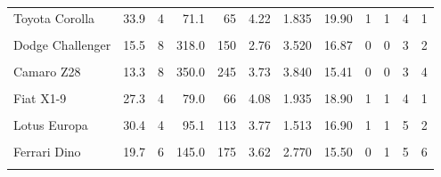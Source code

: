 \documentclass[
  10pt,
]{scrartcl}
\begin{document}
\begin{longtable}[t]{lrrrrrrrrrrr}
Toyota Corolla & 33.9 & 4 & 71.1 & 65 & 4.22 & 1.835 & 19.90 & 1 & 1 & 4 & 1\\
\addlinespace
\cellcolor{gray!10}{Toyota Corona} & \cellcolor{gray!10}{21.5} & \cellcolor{gray!10}{4} & \cellcolor{gray!10}{120.1} & \cellcolor{gray!10}{97} & \cellcolor{gray!10}{3.70} & \cellcolor{gray!10}{2.465} & \cellcolor{gray!10}{20.01} & \cellcolor{gray!10}{1} & \cellcolor{gray!10}{0} & \cellcolor{gray!10}{3} & \cellcolor{gray!10}{1}\\
Dodge Challenger & 15.5 & 8 & 318.0 & 150 & 2.76 & 3.520 & 16.87 & 0 & 0 & 3 & 2\\
\cellcolor{gray!10}{AMC Javelin} & \cellcolor{gray!10}{15.2} & \cellcolor{gray!10}{8} & \cellcolor{gray!10}{304.0} & \cellcolor{gray!10}{150} & \cellcolor{gray!10}{3.15} & \cellcolor{gray!10}{3.435} & \cellcolor{gray!10}{17.30} & \cellcolor{gray!10}{0} & \cellcolor{gray!10}{0} & \cellcolor{gray!10}{3} & \cellcolor{gray!10}{2}\\
Camaro Z28 & 13.3 & 8 & 350.0 & 245 & 3.73 & 3.840 & 15.41 & 0 & 0 & 3 & 4\\
\cellcolor{gray!10}{Pontiac Firebird} & \cellcolor{gray!10}{19.2} & \cellcolor{gray!10}{8} & \cellcolor{gray!10}{400.0} & \cellcolor{gray!10}{175} & \cellcolor{gray!10}{3.08} & \cellcolor{gray!10}{3.845} & \cellcolor{gray!10}{17.05} & \cellcolor{gray!10}{0} & \cellcolor{gray!10}{0} & \cellcolor{gray!10}{3} & \cellcolor{gray!10}{2}\\
\addlinespace
Fiat X1-9 & 27.3 & 4 & 79.0 & 66 & 4.08 & 1.935 & 18.90 & 1 & 1 & 4 & 1\\
\cellcolor{gray!10}{Porsche 914-2} & \cellcolor{gray!10}{26.0} & \cellcolor{gray!10}{4} & \cellcolor{gray!10}{120.3} & \cellcolor{gray!10}{91} & \cellcolor{gray!10}{4.43} & \cellcolor{gray!10}{2.140} & \cellcolor{gray!10}{16.70} & \cellcolor{gray!10}{0} & \cellcolor{gray!10}{1} & \cellcolor{gray!10}{5} & \cellcolor{gray!10}{2}\\
Lotus Europa & 30.4 & 4 & 95.1 & 113 & 3.77 & 1.513 & 16.90 & 1 & 1 & 5 & 2\\
\cellcolor{gray!10}{Ford Pantera L} & \cellcolor{gray!10}{15.8} & \cellcolor{gray!10}{8} & \cellcolor{gray!10}{351.0} & \cellcolor{gray!10}{264} & \cellcolor{gray!10}{4.22} & \cellcolor{gray!10}{3.170} & \cellcolor{gray!10}{14.50} & \cellcolor{gray!10}{0} & \cellcolor{gray!10}{1} & \cellcolor{gray!10}{5} & \cellcolor{gray!10}{4}\\
Ferrari Dino & 19.7 & 6 & 145.0 & 175 & 3.62 & 2.770 & 15.50 & 0 & 1 & 5 & 6\\
\addlinespace

\end{longtable}
\end{document}
